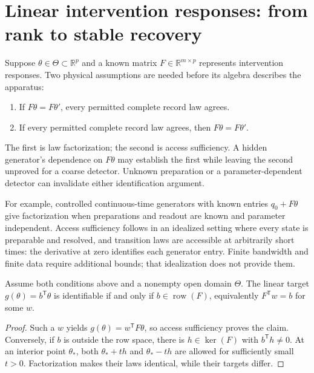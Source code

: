\section{Linear intervention responses: from rank to stable recovery}

Suppose $\theta\in\Theta\subset\mathbb R^p$ and a known matrix
$F\in\mathbb R^{m\times p}$ represents intervention responses. Two physical
assumptions are needed before its algebra describes the apparatus:
\begin{enumerate}
 \item If $F\theta=F\theta'$, every permitted complete record law agrees.
 \item If every permitted complete record law agrees, then $F\theta=F\theta'$.
\end{enumerate}
The first is law factorization; the second is access sufficiency. A hidden
generator's dependence on $F\theta$ may establish the first while leaving the
second unproved for a coarse detector. Unknown preparation or a
parameter-dependent detector can invalidate either identification argument.

For example, controlled continuous-time generators with known entries
$q_0+F\theta$ give factorization when preparations and readout are known and
parameter independent. Access sufficiency follows in an idealized setting where
every state is preparable and resolved, and transition laws are accessible at
arbitrarily short times: the derivative at zero identifies each generator entry.
Finite bandwidth and finite data require additional bounds; that idealization
does not provide them.

\begin{proposition}
\label{precision:row-space}
Assume both conditions above and a nonempty open domain $\Theta$. The linear
target $g(\theta)=b^{\mathsf T}\theta$ is identifiable if and only if
$b\in\operatorname{row}(F)$, equivalently $F^{\mathsf T}w=b$ for some $w$.
\end{proposition}
\begin{proof}
Such a $w$ yields $g(\theta)=w^{\mathsf T}F\theta$, so access sufficiency proves
the claim. Conversely, if $b$ is outside the row space, there is
$h\in\ker(F)$ with $b^{\mathsf T}h\ne0$. At an interior point $\theta_*$,
both $\theta_*+th$ and $\theta_*-th$ are allowed for sufficiently small $t>0$.
Factorization makes their laws identical, while their targets differ.
\end{proof}

